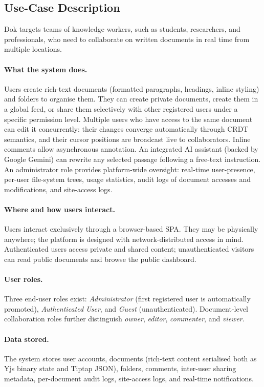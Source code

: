 \documentclass{scrartcl}
\begin{document}
  \subsection{Use-Case Description}
  Dok targets teams of knowledge workers, such as students, researchers, and professionals, who need
  to collaborate on written documents in real time from multiple locations.


  \paragraph{What the system does.}
  Users create rich-text documents (formatted paragraphs, headings, inline styling) and folders
  to organise them. They can create private documents, create them in a global feed, or share them
  selectively with other registered users under a specific permission level. Multiple users who
  have access to the same document can edit it concurrently: their changes converge automatically
  through CRDT semantics, and their cursor positions are broadcast live to collaborators. Inline
  comments allow asynchronous annotation. An integrated AI
  assistant (backed by Google Gemini) can rewrite any selected passage following a free-text
  instruction. An administrator role provides platform-wide oversight: real-time user-presence,
  per-user file-system trees, usage statistics, audit logs of document accesses and modifications,
  and site-access logs.

  \paragraph{Where and how users interact.}
  Users interact exclusively through a browser-based SPA. They may be physically anywhere; the
  platform is designed with network-distributed access in mind. Authenticated users access private
  and shared content; unauthenticated visitors can read public documents and browse the public
  dashboard.

  \paragraph{User roles.}
  Three end-user roles exist: \textit{Administrator} (first registered user is automatically
  promoted), \textit{Authenticated User}, and \textit{Guest} (unauthenticated).
  Document-level collaboration roles further distinguish \textit{owner}, \textit{editor},
  \textit{commenter}, and \textit{viewer}.

  \paragraph{Data stored.}
  The system stores user accounts, documents (rich-text content serialised both as Yjs binary
  state and Tiptap JSON), folders, comments, inter-user sharing metadata, per-document audit
  logs, site-access logs, and real-time notifications.
\end{document}
